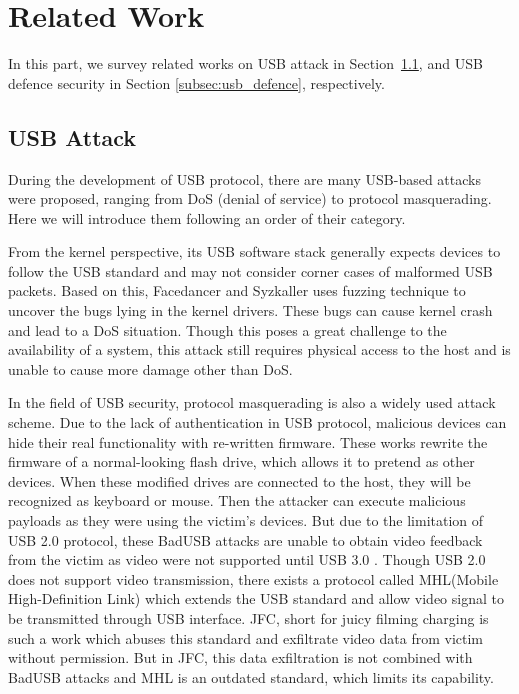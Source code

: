 \section{Related Work}
\label{sec:related_work}

In this part, we survey related works on USB attack in Section~\ref{subsec:usb_attack}, and USB defence security in Section \ref{subsec:usb_defence}, respectively.

\subsection{USB Attack}
\label{subsec:usb_attack}
During the development of USB protocol, there are many USB-based attacks were proposed, ranging from DoS (denial of service) to protocol masquerading. Here we will introduce them following an order of their category.

From the kernel perspective, its USB software stack generally expects devices to follow the USB standard and may not consider corner cases of malformed USB packets. Based on this, Facedancer\cite{facedancer} and Syzkaller\cite{syzkaller} uses fuzzing technique to uncover the bugs lying in the kernel drivers. These bugs can cause kernel crash and lead to a DoS situation. Though this poses a great challenge to the availability of a system, this attack still requires physical access to the host and is unable to cause more damage other than DoS.

In the field of USB security, protocol masquerading is also a widely used attack scheme. Due to the lack of authentication in USB protocol, malicious devices can hide their real functionality with re-written firmware\cite{rubber,badusb, rubberducky2020, usbbypassing, iseeyou, usbdriver}. These works rewrite the firmware of a normal-looking flash drive, which allows it to pretend as other devices. When these modified drives are connected to the host, they will be recognized as keyboard or mouse. Then the attacker can execute malicious payloads as they were using the victim's devices. But due to the limitation of USB 2.0\cite{usb20} protocol, these BadUSB attacks are unable to obtain video feedback from the victim as video were not supported until USB 3.0 \cite{usb30}. Though USB 2.0 does not support video transmission, there exists a protocol called MHL(Mobile High-Definition Link) which extends the USB standard and allow video signal to be transmitted through USB interface. JFC\cite{JFC}, short for juicy filming charging is such a work which abuses this standard and exfiltrate video data from victim without permission. But in JFC, this data exfiltration is not combined with BadUSB attacks and MHL is an outdated standard, which limits its capability.

